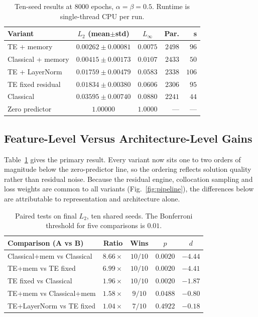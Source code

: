 \documentclass[journal]{IEEEtran}
\begin{document}
\begin{table}[t]
\caption{Ten-seed results at $8000$ epochs, $\alpha=\beta=0.5$.
Runtime is single-thread CPU per run.}
\label{tab:main}
\centering
\footnotesize
\begin{tabular}{@{}lccrr@{}}
\toprule
Variant & $L_2$ (mean$\pm$std) & $L_\infty$ & Par. & s\\
\midrule
TE + memory        & $\mathbf{0.00262\pm0.00081}$ & $0.0075$ & $2498$ & $96$\\
Classical + memory & $0.00415\pm0.00173$ & $0.0107$ & $2433$ & $50$\\
TE + LayerNorm     & $0.01759\pm0.00479$ & $0.0583$ & $2338$ & $106$\\
TE fixed residual  & $0.01834\pm0.00380$ & $0.0606$ & $2306$ & $95$\\
Classical          & $0.03595\pm0.00740$ & $0.0880$ & $2241$ & $44$\\
\midrule
Zero predictor     & $1.00000$ & $1.0000$ & --- & ---\\
\bottomrule
\end{tabular}
\end{table}

\subsection{Feature-Level Versus Architecture-Level Gains}
Table~\ref{tab:main} gives the primary result. Every variant now sits one to two
orders of magnitude below the zero-predictor line, so the ordering reflects
solution quality rather than residual noise. Because the residual engine,
collocation sampling and loss weights are common to all variants
(Fig.~\ref{fig:pipeline}), the differences below are attributable to
representation and architecture alone.

\begin{table}[t]
\caption{Paired tests on final $L_2$, ten shared seeds. The Bonferroni threshold
for five comparisons is $0.01$.}
\label{tab:paired}
\centering
\footnotesize
\begin{tabular}{@{}lcccc@{}}
\toprule
Comparison (A vs B) & Ratio & Wins & $p$ & $d$\\
\midrule
Classical+mem vs Classical & $8.66\times$ & $10/10$ & $0.0020$ & $-4.44$\\
TE+mem vs TE fixed         & $6.99\times$ & $10/10$ & $0.0020$ & $-4.41$\\
TE fixed vs Classical      & $1.96\times$ & $10/10$ & $0.0020$ & $-1.87$\\
TE+mem vs Classical+mem    & $1.58\times$ & $9/10$  & $0.0488$ & $-0.80$\\
TE+LayerNorm vs TE fixed   & $1.04\times$ & $7/10$  & $0.4922$ & $-0.18$\\
\bottomrule
\end{tabular}
\end{table}
\end{document}

